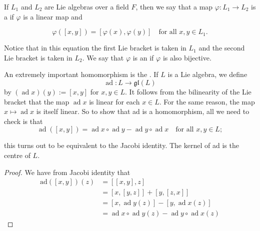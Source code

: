 \documentclass[../main.tex]{subfiles}
\begin{document}
\begin{definition}{}{}
   If $L_1$ and $L_2$ are Lie algebras over a field $F$, then we say that a map $\varphi : L_1 \to L_2$ is a  if $\varphi$ is a linear map and

\[
\varphi([x,y]) = [\varphi(x), \varphi(y)] \quad \text{for all } x, y \in L_1.
\]

Notice that in this equation the first Lie bracket is taken in $L_1$ and the second Lie bracket is taken in $L_2$. We say that $\varphi$ is an  if $\varphi$ is also bijective.
\end{definition}

\begin{example}{}{}
     An extremely important homomorphism is the . If $L$ is a Lie algebra, we define
\[
\operatorname{ad}: L \to \mathfrak{gl}(L)
\]
by $(\operatorname{ad} x)(y) := [x, y]$ for $x, y \in L$. It follows from the bilinearity of the Lie bracket that the map $\operatorname{ad} x$ is linear for each $x \in L$. For the same reason, the map $x \mapsto \operatorname{ad} x$ is itself linear. So to show that ad is a homomorphism, all we need to check is that
\[
\operatorname{ad}([x, y]) = \operatorname{ad} x \circ \operatorname{ad} y - \operatorname{ad} y \circ \operatorname{ad} x \quad \text{for all } x, y \in L;
\]

this turns out to be equivalent to the Jacobi identity. The kernel of ad is the centre of $L$.

\end{example}
\begin{proof}
    We have from Jacobi identity that \[
    \begin{aligned}
    \mathrm{ad}\left( \left[ x,y \right]  \right)\left( z \right)&=  \left[ \left[ x,y \right],z  \right]\\ 
     &= \left[ x,\left[ y,z \right]  \right]+ \left[ y,\left[ z,x \right]  \right]      \\ 
      &=\left[ x, \operatorname{ad}y\left( z \right)  \right]-\left[ y, \operatorname{ad}x\left( z \right)  \right]\\ 
       &= \operatorname{ad}x\circ \operatorname{ad}y\left( z \right)-\operatorname{ad}y\circ \operatorname{ad}x\left( z \right)      
    \end{aligned}
    \]
\end{proof}
\end{document}
